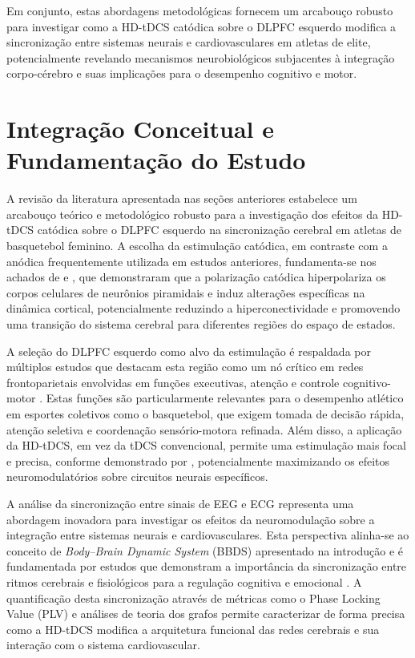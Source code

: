 Em conjunto, estas abordagens metodológicas fornecem um arcabouço robusto para investigar como a HD-tDCS catódica sobre o DLPFC esquerdo modifica a sincronização entre sistemas neurais e cardiovasculares em atletas de elite, potencialmente revelando mecanismos neurobiológicos subjacentes à integração corpo-cérebro e suas implicações para o desempenho cognitivo e motor.

\section{Integração Conceitual e Fundamentação do Estudo}
A revisão da literatura apresentada nas seções anteriores estabelece um arcabouço teórico e metodológico robusto para a investigação dos efeitos da HD-tDCS catódica sobre o DLPFC esquerdo na sincronização cerebral em atletas de basquetebol feminino. A escolha da estimulação catódica, em contraste com a anódica frequentemente utilizada em estudos anteriores, fundamenta-se nos achados de  e , que demonstraram que a polarização catódica hiperpolariza os corpos celulares de neurônios piramidais e induz alterações específicas na dinâmica cortical, potencialmente reduzindo a hiperconectividade e promovendo uma transição do sistema cerebral para diferentes regiões do espaço de estados.

A seleção do DLPFC esquerdo como alvo da estimulação é respaldada por múltiplos estudos que destacam esta região como um nó crítico em redes frontoparietais envolvidas em funções executivas, atenção e controle cognitivo-motor \cite{dong2023efficacy, arif2021high, jones2017frontoparietal}. Estas funções são particularmente relevantes para o desempenho atlético em esportes coletivos como o basquetebol, que exigem tomada de decisão rápida, atenção seletiva e coordenação sensório-motora refinada. Além disso, a aplicação da HD-tDCS, em vez da tDCS convencional, permite uma estimulação mais focal e precisa, conforme demonstrado por , potencialmente maximizando os efeitos neuromodulatórios sobre circuitos neurais específicos.

A análise da sincronização entre sinais de EEG e ECG representa uma abordagem inovadora para investigar os efeitos da neuromodulação sobre a integração entre sistemas neurais e cardiovasculares. Esta perspectiva alinha-se ao conceito de \textit{Body--Brain Dynamic System} (BBDS) apresentado na introdução e é fundamentada por estudos que demonstram a importância da sincronização entre ritmos cerebrais e fisiológicos para a regulação cognitiva e emocional \cite{criscuolo2022cognition, vergara2024exploring}. A quantificação desta sincronização através de métricas como o Phase Locking Value (PLV) e análises de teoria dos grafos permite caracterizar de forma precisa como a HD-tDCS modifica a arquitetura funcional das redes cerebrais e sua interação com o sistema cardiovascular.

